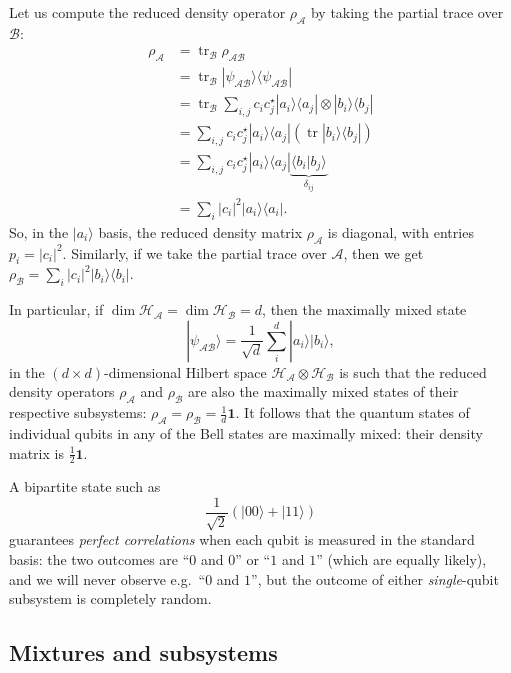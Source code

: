 \documentclass[fleqn]{article}
\begin{document}
Let us compute the reduced density operator \(\rho_{\mathcal{A}}\) by taking the partial trace over \(\mathcal{B}\):
\[
  \begin{aligned}
    \rho_{\mathcal{A}}
    &= \operatorname{tr}_{\mathcal{B}}\rho_{\mathcal{AB}}
  \\&= \operatorname{tr}_{\mathcal{B}} |\psi_{\mathcal{AB}}\rangle\langle\psi_{\mathcal{AB}}|
  \\&= \operatorname{tr}_{\mathcal{B}} \sum_{i,j} c_i c^\star_j |a_i\rangle\langle a_j| \otimes |b_i\rangle\langle b_j|
  \\&= \sum_{i,j} c_i c^\star_j |a_i\rangle\langle a_j|(\operatorname{tr}|b_i\rangle\langle b_j|)
  \\&= \sum_{i,j} c_i c^\star_j |a_i\rangle\langle a_j| \underbrace{\langle b_i|b_j\rangle}_{\delta_{ij}}
  \\& = \sum_{i} |c_i|^2 |a_i\rangle\langle a_i|.
  \end{aligned}
\]
So, in the \(|a_i\rangle\) basis, the reduced density matrix \(\rho_{\mathcal{A}}\) is diagonal, with entries \(p_i=|c_i|^2\).
Similarly, if we take the partial trace over \(\mathcal{A}\), then we get \(\rho_{\mathcal{B}}=\sum_{i} |c_i|^2 |b_i\rangle\langle b_i|\).

In particular, if \(\dim\mathcal{H}_{\mathcal{A}}=\dim\mathcal{H}_{\mathcal{B}}=d\), then the maximally mixed state
\[
  |\psi_{\mathcal{AB}}\rangle
  = \frac{1}{\sqrt{d}} \sum_{i}^d |a_i\rangle|b_i\rangle,
\]
in the \((d\times d)\)-dimensional Hilbert space \(\mathcal{H}_{\mathcal{A}}\otimes\mathcal{H}_{\mathcal{B}}\) is such that the reduced density operators \(\rho_{\mathcal{A}}\) and \(\rho_{\mathcal{B}}\) are also the maximally mixed states of their respective subsystems: \(\rho_{\mathcal{A}}=\rho_{\mathcal{B}}=\frac{1}{d}\mathbf{1}\).
It follows that the quantum states of individual qubits in any of the Bell states are maximally mixed: their density matrix is \(\frac{1}{2}\mathbf{1}\).

A bipartite state such as
\[
  \frac{1}{\sqrt{2}} \left( |00\rangle + |11\rangle \right)
\]
guarantees \emph{perfect correlations} when each qubit is measured in the standard basis: the two outcomes are ``\(0\) and \(0\)'' or ``\(1\) and \(1\)'' (which are equally likely), and we will never observe e.g.~``\(0\) and \(1\)'', but the outcome of either \emph{single}-qubit subsystem is completely random.

\hypertarget{mixtures-and-subsystems}{%
\subsection{Mixtures and subsystems}\label{mixtures-and-subsystems}}
\end{document}
